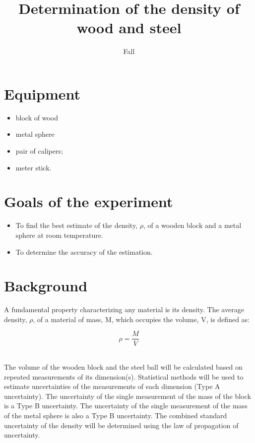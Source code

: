 \documentclass[justified]{tufte-handout}
\title{Determination of the density of wood and steel}
\author{}
\date{Fall \the\year}
\begin{document}
\maketitle
\setcounter{tocdepth}{1}
\tableofcontents

\section{Equipment}
\begin{minipage}[t]{0.5\textwidth}
\begin{itemize}%
\item[] block of wood
\item[] metal sphere
\end{itemize}
\end{minipage}
\begin{minipage}[t]{0.5\textwidth}
\begin{itemize}%
\item[] pair of calipers;
\item[] meter stick.
\end{itemize}
\end{minipage}



\section{Goals of the experiment}
\begin{itemize}
\item To find the best estimate of the density, $\rho$, of a wooden block and a metal sphere at room temperature.
\item To determine the accuracy of the estimation.
\end{itemize}
\section{Background}

A fundamental property characterizing any material is its density. The average density, $\rho$, of a material of mass, M, which occupies the volume, V, is defined as:

\begin{equation}\label{eq:densityqn}
{\rho}=\frac{M}{V}
\end{equation} 
\

The volume of the wooden block and the steel ball will be calculated based on repeated measurements of its dimension(s). Statistical methods will be used to estimate uncertainties of the measurements of each dimension (Type A uncertainty). The uncertainty of the single measurement of the mass of the block is a Type B uncertainty. The uncertainty of the single measurement of the mass of the metal sphere is also a Type B uncertainty. The combined standard uncertainty of the density will be determined using the law of propagation of uncertainty.
\end{document}
